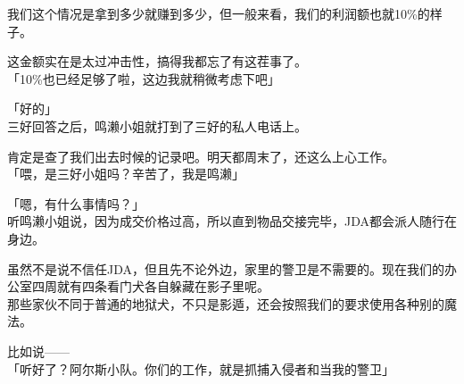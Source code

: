 我们这个情况是拿到多少就赚到多少，但一般来看，我们的利润额也就10\%的样子。

这金额实在是太过冲击性，搞得我都忘了有这茬事了。\\

「10\%也已经足够了啦，这边我就稍微考虑下吧」

「好的」\\

三好回答之后，鸣濑小姐就打到了三好的私人电话上。

肯定是查了我们出去时候的记录吧。明天都周末了，还这么上心工作。\\

「喂，是三好小姐吗？辛苦了，我是鸣濑」

「嗯，有什么事情吗？」\\

听鸣濑小姐说，因为成交价格过高，所以直到物品交接完毕，JDA都会派人随行在身边。

虽然不是说不信任JDA，但且先不论外边，家里的警卫是不需要的。现在我们的办公室四周就有四条看门犬各自躲藏在影子里呢。\\

那些家伙不同于普通的地狱犬，不只是影遁，还会按照我们的要求使用各种别的魔法。

比如说——\\

「听好了？阿尔斯小队。你们的工作，就是抓捕入侵者和当我的警卫」

